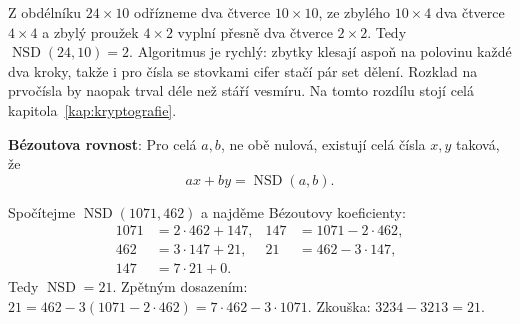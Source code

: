\begin{center}
\end{center}

Z obdélníku $24\times 10$ odřízneme dva čtverce $10\times 10$, ze zbylého $10\times 4$ dva čtverce $4\times 4$ a zbylý proužek $4\times 2$ vyplní přesně dva čtverce $2\times 2$. Tedy $\operatorname{NSD}(24, 10) = 2$. Algoritmus je rychlý: zbytky klesají aspoň na polovinu každé dva kroky, takže i pro čísla se stovkami cifer stačí pár set dělení. Rozklad na prvočísla by naopak trval déle než stáří vesmíru. Na tomto rozdílu stojí celá kapitola~\ref{kap:kryptografie}.

\begin{definitionbox}
  \textbf{Bézoutova rovnost}: Pro celá $a, b$, ne obě nulová, existují celá čísla $x, y$ taková, že
  \begin{equation*}
    ax + by = \operatorname{NSD}(a, b).
  \end{equation*}
\end{definitionbox}

\begin{example}
  Spočítejme $\operatorname{NSD}(1071, 462)$ a najděme Bézoutovy koeficienty:
  \begin{align*}
    1071 &= 2\cdot 462 + 147, & 147 &= 1071 - 2\cdot 462,\\
    462 &= 3\cdot 147 + 21, & 21 &= 462 - 3\cdot 147,\\
    147 &= 7\cdot 21 + 0.
  \end{align*}
  Tedy $\operatorname{NSD} = 21$. Zpětným dosazením: $21 = 462 - 3(1071 - 2\cdot 462) = 7\cdot 462 - 3\cdot 1071$. Zkouška: $3234 - 3213 = 21$.
\end{example}

